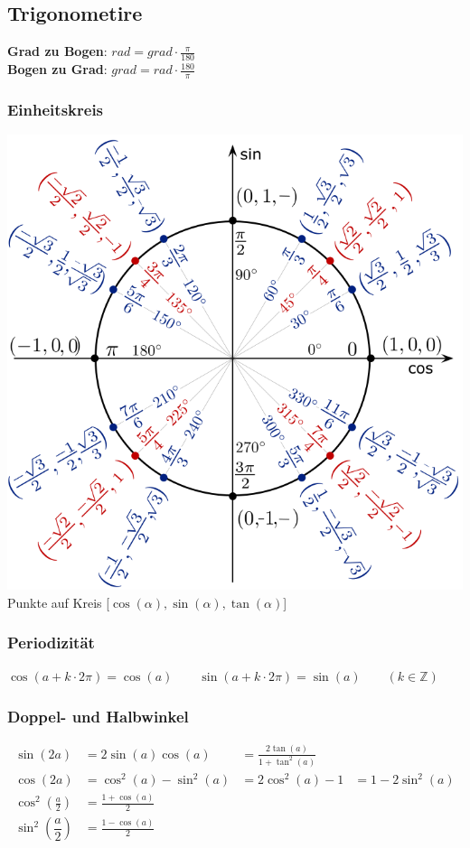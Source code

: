 \subsection{Trigonometire}
\noindent\textbf{Grad zu Bogen}: $ rad = grad \cdot \frac{\pi}{180} $~\\
\noindent\textbf{Bogen zu Grad}: $ grad = rad \cdot \frac{180}{\pi}$
\subsubsection{Einheitskreis}
\begin{center}
	\includegraphics[width=0.8\columnwidth]{Images/einheitskreis}\\
	Punkte auf Kreis [$\cos(\alpha), \sin(\alpha), \tan(\alpha)$]
\end{center}

\subsubsection{Periodizität}
$\cos(a+k\cdot2\pi)=\cos(a) \qquad \sin(a+k\cdot2\pi)=\sin(a) \qquad
(k \in \mathbb{Z})$

\subsubsection{Doppel- und Halbwinkel}	
\begin{align*}
	\sin(2a) &=2\sin(a)\cos(a) &= \frac{2\tan(a)}{1 +\tan^2(a)}\\
	\cos(2a) &=\cos^2(a)-\sin^2(a) &= 2\cos^2(a)-1 &= 1-2\sin^2(a)\\
	\cos^2 \left(\frac{a}{2}\right) &=\frac{1+\cos(a)}{2} \\
	\sin^2 \left(\dfrac{a}{2}\right)&=\frac{1-\cos(a)}{2}
\end{align*}


